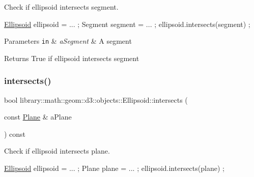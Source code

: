 Check if ellipsoid intersects segment. 


\begin{DoxyCode}
\hyperlink{classlibrary_1_1math_1_1geom_1_1d3_1_1objects_1_1_ellipsoid_aae81fe0edc7f0e8d4590ea89ae73cb14}{Ellipsoid} ellipsoid = ... ;
Segment segment = ... ;
ellipsoid.intersects(segment) ;
\end{DoxyCode}



\begin{DoxyParams}[1]{Parameters}
\mbox{\tt in}  & {\em a\+Segment} & A segment \\
\hline
\end{DoxyParams}
\begin{DoxyReturn}{Returns}
True if ellipsoid intersects segment 
\end{DoxyReturn}
\mbox{\label{classlibrary_1_1math_1_1geom_1_1d3_1_1objects_1_1_ellipsoid_ada79a3cf3bf68843a8313eb914c21a95}} 
\subsubsection{\texorpdfstring{intersects()}{intersects()}\hspace{0.1cm}{\footnotesize\ttfamily [6/10]}}
{\footnotesize\ttfamily bool library\+::math\+::geom\+::d3\+::objects\+::\+Ellipsoid\+::intersects (\begin{DoxyParamCaption}\item[{const \hyperlink{classlibrary_1_1math_1_1geom_1_1d3_1_1objects_1_1_plane}{Plane} \&}]{a\+Plane }\end{DoxyParamCaption}) const}



Check if ellipsoid intersects plane. 


\begin{DoxyCode}
\hyperlink{classlibrary_1_1math_1_1geom_1_1d3_1_1objects_1_1_ellipsoid_aae81fe0edc7f0e8d4590ea89ae73cb14}{Ellipsoid} ellipsoid = ... ;
Plane plane = ... ;
ellipsoid.intersects(plane) ;
\end{DoxyCode}



